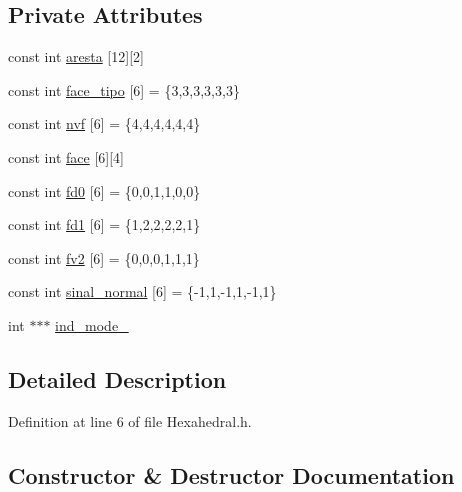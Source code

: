 \subsection*{Private Attributes}
\begin{DoxyCompactItemize}
\item 
const int \hyperlink{classHexahedral_a195b8018b7e8b6d1366b1937803051e1}{aresta} \mbox{[}12\mbox{]}\mbox{[}2\mbox{]}
\item 
const int \hyperlink{classHexahedral_a94a89e53e7dd2f1d490205e97a2a82d8}{face\+\_\+tipo} \mbox{[}6\mbox{]} = \{3,3,3,3,3,3\}
\item 
const int \hyperlink{classHexahedral_a2ee5b71919dfc0b878e5282bb86909f9}{nvf} \mbox{[}6\mbox{]} = \{4,4,4,4,4,4\}
\item 
const int \hyperlink{classHexahedral_a65cf7e5570801bd2fa3c5c35b263fbf2}{face} \mbox{[}6\mbox{]}\mbox{[}4\mbox{]}
\item 
const int \hyperlink{classHexahedral_a39fe746c1ec3283acf9748af64a6252c}{fd0} \mbox{[}6\mbox{]} = \{0,0,1,1,0,0\}
\item 
const int \hyperlink{classHexahedral_a9f60ba5d3fbfabfad6fb34516ed3b685}{fd1} \mbox{[}6\mbox{]} = \{1,2,2,2,2,1\}
\item 
const int \hyperlink{classHexahedral_a7aeb094f58a7932918fe74fa4ebc66ec}{fv2} \mbox{[}6\mbox{]} = \{0,0,0,1,1,1\}
\item 
const int \hyperlink{classHexahedral_a20e8fb8b0d5bbe0b16676290f82324cf}{sinal\+\_\+normal} \mbox{[}6\mbox{]} = \{-\/1,1,-\/1,1,-\/1,1\}
\item 
int $\ast$$\ast$$\ast$ \hyperlink{classHexahedral_ab4a2ad7d8c0e9509f8eb0ef64bc44d4c}{ind\+\_\+mode\+\_\+}
\end{DoxyCompactItemize}


\subsection{Detailed Description}


Definition at line 6 of file Hexahedral.\+h.



\subsection{Constructor \& Destructor Documentation}
\mbox{\label{classHexahedral_accce80b563e28b4f372419b510c5f122}} 
